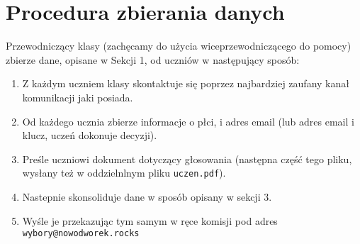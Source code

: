 \section{Procedura zbierania danych}

Przewodniczący klasy (zachęcamy do użycia wiceprzewodniczącego do pomocy) zbierze dane, opisane w Sekcji 1, od uczniów w następujący sposób:

\begin{enumerate}[label=(\arabic*)]%
  \item Z każdym uczniem klasy skontaktuje się poprzez najbardziej zaufany kanał komunikacji jaki posiada.
  \item Od każdego ucznia zbierze informacje o płci, i adres email (lub adres email i klucz, uczeń dokonuje decyzji).
  \item Preśle uczniowi dokument dotyczący głosowania (następna część tego pliku, wysłany też w oddzielnlnym pliku \texttt{uczen.pdf}).
  \item Nastepnie skonsoliduje dane w sposób opisany w sekcji 3.
  \item Wyśle je przekazując tym samym w ręce komisji pod adres \texttt{wybory@nowodworek.rocks}
\end{enumerate}
